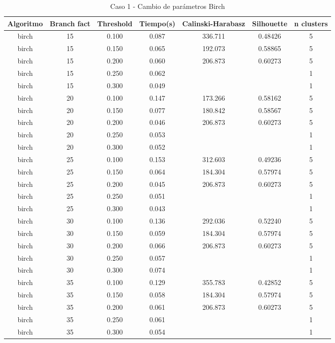 \begin{table}[H]
\centering
\caption{Caso 1 - Cambio de parámetros Birch}
\label{tab:c1_birch}
\begin{tabular}{ccccccc}
\toprule
Algoritmo & Branch fact & Threshold & Tiempo(s) & Calinski-Harabasz & Silhouette & n clusters \\
\midrule
birch & 15 & 0.100 & 0.087 & 336.711 & 0.48426 & 5 \\
birch & 15 & 0.150 & 0.065 & 192.073 & 0.58865 & 5 \\
birch & 15 & 0.200 & 0.060 & 206.873 & 0.60273 & 5 \\
birch & 15 & 0.250 & 0.062 &  &  & 1 \\
birch & 15 & 0.300 & 0.049 &  &  & 1 \\
birch & 20 & 0.100 & 0.147 & 173.266 & 0.58162 & 5 \\
birch & 20 & 0.150 & 0.077 & 180.842 & 0.58567 & 5 \\
birch & 20 & 0.200 & 0.046 & 206.873 & 0.60273 & 5 \\
birch & 20 & 0.250 & 0.053 &  &  & 1 \\
birch & 20 & 0.300 & 0.052 &  &  & 1 \\
birch & 25 & 0.100 & 0.153 & 312.603 & 0.49236 & 5 \\
birch & 25 & 0.150 & 0.064 & 184.304 & 0.57974 & 5 \\
birch & 25 & 0.200 & 0.045 & 206.873 & 0.60273 & 5 \\
birch & 25 & 0.250 & 0.051 &  &  & 1 \\
birch & 25 & 0.300 & 0.043 &  &  & 1 \\
birch & 30 & 0.100 & 0.136 & 292.036 & 0.52240 & 5 \\
birch & 30 & 0.150 & 0.059 & 184.304 & 0.57974 & 5 \\
birch & 30 & 0.200 & 0.066 & 206.873 & 0.60273 & 5 \\
birch & 30 & 0.250 & 0.057 &  &  & 1 \\
birch & 30 & 0.300 & 0.074 &  &  & 1 \\
birch & 35 & 0.100 & 0.129 & 355.783 & 0.42852 & 5 \\
birch & 35 & 0.150 & 0.058 & 184.304 & 0.57974 & 5 \\
birch & 35 & 0.200 & 0.061 & 206.873 & 0.60273 & 5 \\
birch & 35 & 0.250 & 0.061 &  &  & 1 \\
birch & 35 & 0.300 & 0.054 &  &  & 1 \\
\bottomrule
\end{tabular}
\end{table}

